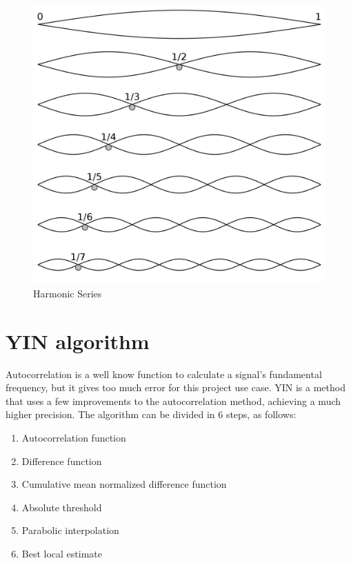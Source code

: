 \begin{figure}[htb]
	\caption{Harmonic Series}
  \label{harmonic-series}
	\begin{center}
    \includegraphics[scale=0.15]{images/harmonic-series.png}
	\end{center}
\end{figure}

\section{YIN algorithm}

Autocorrelation is a well know function to calculate a signal's fundamental
frequency, but it gives too much error for this project use case. YIN \cite{YINArticle}
is a method that uses a few improvements to the autocorrelation method, achieving
a much higher precision. The algorithm can be divided in 6 steps, as follows:

\begin{enumerate}
  \item Autocorrelation function
  \item Difference function
  \item Cumulative mean normalized difference function
  \item Absolute threshold
  \item Parabolic interpolation
  \item Best local estimate
\end{enumerate}
